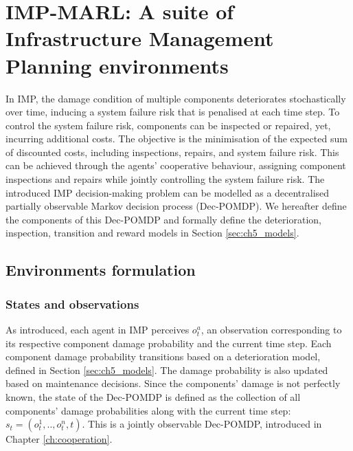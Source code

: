 \section{IMP-MARL: A suite of Infrastructure Management Planning environments} \label{sec:ch5_imp}

In IMP, the damage condition of multiple components deteriorates stochastically over time, inducing a system failure risk that is penalised at each time step.
To control the system failure risk, components can be inspected or repaired, yet, incurring additional costs.
The objective is the minimisation of the expected sum of discounted costs, including inspections, repairs, and system failure risk.
This can be achieved through the agents' cooperative behaviour, assigning component inspections and repairs while jointly controlling the system failure risk.
The introduced IMP decision-making problem can be modelled as a decentralised partially observable Markov decision process (Dec-POMDP).
We hereafter define the components of this Dec-POMDP and formally define the deterioration, inspection, transition and reward models in Section \ref{sec:ch5_models}.

\subsection{Environments formulation}
\label{sec:env_formulation}

\subsubsection{States and observations}
As introduced, each agent in IMP perceives $o^a_t$, an observation corresponding to its respective component damage probability and the current time step.
Each component damage probability transitions based on a deterioration model, defined in Section \ref{sec:ch5_models}.
The damage probability is also updated based on maintenance decisions.
Since the components' damage is not perfectly known, the state of the Dec-POMDP is defined as the collection of all components' damage probabilities along with the current time step: $s_t = (o_t^1, .., o_t^n, t)$.
This is a jointly observable Dec-POMDP, introduced in Chapter \ref{ch:cooperation}.


